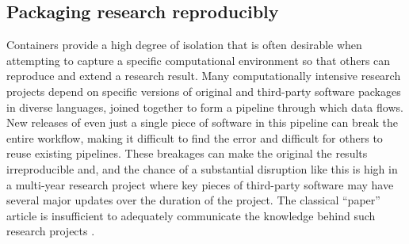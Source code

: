 \hypertarget{packaging-research-reproducibly}{%
\subsection{Packaging research
reproducibly}\label{packaging-research-reproducibly}}

\label{compendia}

Containers provide a high degree of isolation that is often desirable
when attempting to capture a specific computational environment so that
others can reproduce and extend a research result. Many computationally
intensive research projects depend on specific versions of original and
third-party software packages in diverse languages, joined together to
form a pipeline through which data flows. New releases of even just a
single piece of software in this pipeline can break the entire workflow,
making it difficult to find the error and difficult for others to reuse
existing pipelines. These breakages can make the original the results
irreproducible and, and the chance of a substantial disruption like this
is high in a multi-year research project where key pieces of third-party
software may have several major updates over the duration of the
project. The classical ``paper'' article is insufficient to adequately
communicate the knowledge behind such research projects
\citep[cf.][]{donoho_invitation_2010,marwick_how_2015}.


